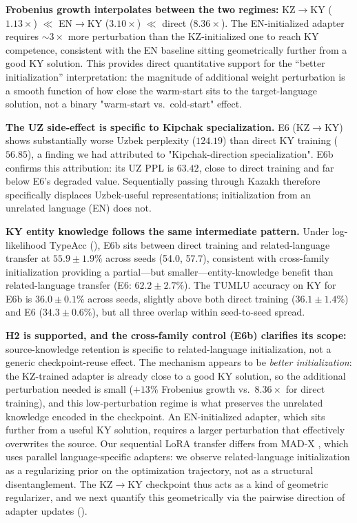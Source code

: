 \documentclass[11pt]{article}
\begin{document}
\textbf{Frobenius growth interpolates between the two regimes:} KZ$\rightarrow$KY ($1.13\times$) $\ll$ EN$\rightarrow$KY ($3.10\times$) $\ll$ direct ($8.36\times$). The EN-initialized adapter requires $\sim 3\times$ more perturbation than the KZ-initialized one to reach KY competence, consistent with the EN baseline sitting geometrically further from a good KY solution. This provides direct quantitative support for the ``better initialization'' interpretation: the magnitude of additional weight perturbation is a smooth function of how close the warm-start sits to the target-language solution, not a binary "warm-start vs.\ cold-start" effect.

\textbf{The UZ side-effect is specific to Kipchak specialization.} E6 (KZ$\rightarrow$KY) shows substantially worse Uzbek perplexity ($124.19$) than direct KY training ($56.85$), a finding we had attributed to "Kipchak-direction specialization". E6b confirms this attribution: its UZ PPL is $63.42$, close to direct training and far below E6's degraded value. Sequentially passing through Kazakh therefore specifically displaces Uzbek-useful representations; initialization from an unrelated language (EN) does not.

\textbf{KY entity knowledge follows the same intermediate pattern.} Under log-likelihood TypeAcc (), E6b sits between direct training and related-language transfer at $55.9 \pm 1.9\%$ across seeds (54.0, 57.7), consistent with cross-family initialization providing a partial---but smaller---entity-knowledge benefit than related-language transfer (E6: $62.2 \pm 2.7\%$). The TUMLU accuracy on KY for E6b is $36.0 \pm 0.1\%$ across seeds, slightly above both direct training ($36.1 \pm 1.4\%$) and E6 ($34.3 \pm 0.6\%$), but all three overlap within seed-to-seed spread.

\textbf{H2 is supported, and the cross-family control (E6b) clarifies its scope:} source-knowledge retention is specific to related-language initialization, not a generic checkpoint-reuse effect. The mechanism appears to be \emph{better initialization}: the KZ-trained adapter is already close to a good KY solution, so the additional perturbation needed is small ($+13\%$ Frobenius growth vs.\ $8.36\times$ for direct training), and this low-perturbation regime is what preserves the unrelated knowledge encoded in the checkpoint. An EN-initialized adapter, which sits further from a useful KY solution, requires a larger perturbation that effectively overwrites the source. Our sequential LoRA transfer differs from MAD-X \cite{pfeiffer2020madx}, which uses parallel language-specific adapters: we observe related-language initialization as a regularizing prior on the optimization trajectory, not as a structural disentanglement. The KZ$\rightarrow$KY checkpoint thus acts as a kind of geometric regularizer, and we next quantify this geometrically via the pairwise direction of adapter updates ().
\end{document}
